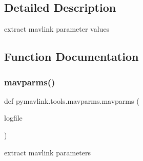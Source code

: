 \subsection{Detailed Description}
\begin{DoxyVerb}extract mavlink parameter values
\end{DoxyVerb}
 

\subsection{Function Documentation}
\mbox{\label{namespacepymavlink_1_1tools_1_1mavparms_a2c8ba68bb852463fbf55c9823e303d0a}} 
\subsubsection{\texorpdfstring{mavparms()}{mavparms()}}
{\footnotesize\ttfamily def pymavlink.\+tools.\+mavparms.\+mavparms (\begin{DoxyParamCaption}\item[{}]{logfile }\end{DoxyParamCaption})}

\begin{DoxyVerb}extract mavlink parameters\end{DoxyVerb}
 